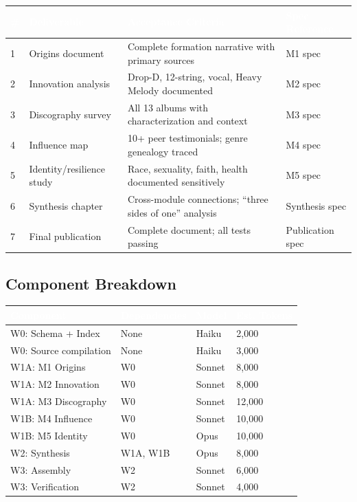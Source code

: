 \documentclass[11pt,letterpaper]{article}
\newcommand{\tableheader}[1]{\textbf{\sffamily\textcolor{white}{#1}}}
\begin{document}
\begin{center}
\begin{tabularx}{\textwidth}{C{0.5cm}L{4cm}X L{3cm}}
\toprule
{}
\tableheader{\#} & \tableheader{Deliverable} & \tableheader{Acceptance Criteria} & \tableheader{Spec Reference} \\
 & Origins document & Complete formation narrative with primary sources & M1 spec \\
2 & Innovation analysis & Drop-D, 12-string, vocal, Heavy Melody documented & M2 spec \\
3 & Discography survey & All 13 albums with characterization and context & M3 spec \\
4 & Influence map & 10+ peer testimonials; genre genealogy traced & M4 spec \\
5 & Identity/resilience study & Race, sexuality, faith, health documented sensitively & M5 spec \\
6 & Synthesis chapter & Cross-module connections; ``three sides of one'' analysis & Synthesis spec \\
7 & Final publication & Complete document; all tests passing & Publication spec \\
\bottomrule
\end{tabularx}
\end{center}

\subsection{Component Breakdown}

\begin{center}
\begin{tabularx}{\textwidth}{L{3.5cm}L{2.5cm}C{1.5cm}C{2cm}}
\toprule
{}
\tableheader{Component} & \tableheader{Dependencies} & \tableheader{Model} & \tableheader{Est. Tokens} \\
\midrule
W0: Schema + Index & None & Haiku & 2,000 \\
W0: Source compilation & None & Haiku & 3,000 \\
W1A: M1 Origins & W0 & Sonnet & 8,000 \\
W1A: M2 Innovation & W0 & Sonnet & 8,000 \\
W1A: M3 Discography & W0 & Sonnet & 12,000 \\
W1B: M4 Influence & W0 & Sonnet & 10,000 \\
W1B: M5 Identity & W0 & Opus & 10,000 \\
W2: Synthesis & W1A, W1B & Opus & 8,000 \\
W3: Assembly & W2 & Sonnet & 6,000 \\
W3: Verification & W2 & Sonnet & 4,000 \\
\bottomrule
\end{tabularx}
\end{center}
\end{document}

